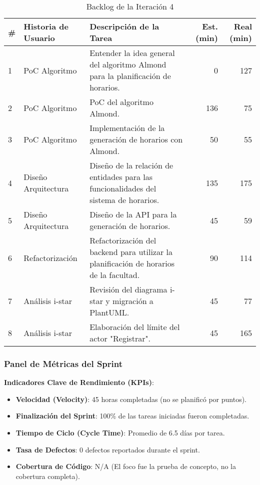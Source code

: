 \begin{table}[H]
\caption{Backlog de la Iteración 4}
\label{tab:iteration-4-backlog}
\begin{tabularx}{\textwidth}{@{}llXrr@{}}
\toprule
\textbf{\#} & \textbf{Historia de Usuario} & \textbf{Descripción de la Tarea} & \textbf{Est. (min)} & \textbf{Real (min)} \\
\midrule
    1 & PoC Algoritmo & Entender la idea general del algoritmo Almond para la planificación de horarios. & 0 & 127 \\
    2 & PoC Algoritmo & PoC del algoritmo Almond. & 136 & 75 \\
    3 & PoC Algoritmo & Implementación de la generación de horarios con Almond. & 50 & 55 \\
    4 & Diseño Arquitectura & Diseño de la relación de entidades para las funcionalidades del sistema de horarios. & 135 & 175 \\
    5 & Diseño Arquitectura & Diseño de la API para la generación de horarios. & 45 & 59 \\
    6 & Refactorización & Refactorización del backend para utilizar la planificación de horarios de la facultad. & 90 & 114 \\
    7 & Análisis i-star & Revisión del diagrama i-star y migración a PlantUML. & 45 & 77 \\
    8 & Análisis i-star & Elaboración del límite del actor "Registrar". & 45 & 165 \\
\bottomrule
\end{tabularx}
\end{table}

\subsubsection{Panel de Métricas del Sprint}


\textbf{Indicadores Clave de Rendimiento (KPIs)}:
\begin{itemize}
    \item \textbf{Velocidad (Velocity)}: 45 horas completadas (no se planificó por puntos).
    \item \textbf{Finalización del Sprint}: 100\% de las tareas iniciadas fueron completadas.
    \item \textbf{Tiempo de Ciclo (Cycle Time)}: Promedio de 6.5 días por tarea.
    \item \textbf{Tasa de Defectos}: 0 defectos reportados durante el sprint.
    \item \textbf{Cobertura de Código}: N/A (El foco fue la prueba de concepto, no la cobertura completa).
\end{itemize}

